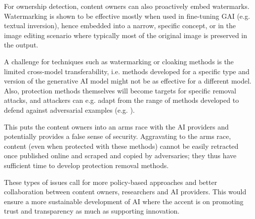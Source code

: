 For ownership detection, content owners can also proactively embed watermarks. 
Watermarking is shown to be effective mostly when used in fine-tuning GAI (e.g. textual inversion), hence embedded into a narrow, specific concept, or in the image editing scenario where typically most of the original image is preserved in the output. 

A challenge for techniques such as watermarking or cloaking methods is the limited cross-model transferability, i.e. methods developed for a specific type and version of the generative AI model might not be as effective for a different model. Also, protection methods themselves will become targets for specific removal attacks, and attackers can e.g. adapt from the range of methods developed to defend against adversarial examples (e.g. \cite{meng_magnet_2017}).

This puts the content owners into an arms race with the AI providers and potentially provides a false sense of security.
Aggravating to the arms race, content (even when protected with these methods) cannot be easily retracted once published online and scraped and copied by adversaries; they thus have sufficient time to develop protection removal methods.

These types of issues call for more policy-based approaches and better collaboration between content owners, researchers and AI providers. 
This would ensure a more sustainable development of AI where the accent is on promoting trust and transparency as much as supporting innovation. 